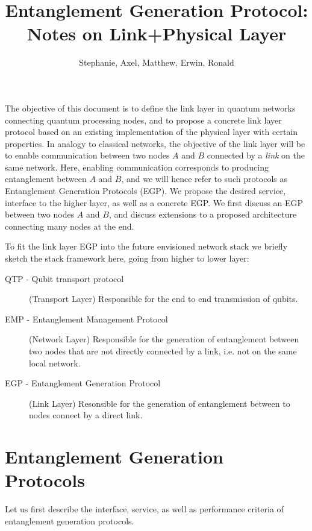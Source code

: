 \documentclass{article}
\begin{document}
\title{Entanglement Generation Protocol: Notes on Link+Physical Layer}
\author{Stephanie, Axel, Matthew, Erwin, Ronald}
\maketitle

The objective of this document is to define the link layer in quantum networks connecting quantum processing nodes, and to propose a concrete link layer protocol 
based on an existing implementation of the physical layer with certain properties. In analogy to classical networks, the objective of the link layer will be to enable communication between two nodes $A$ and $B$ connected by a \emph{link} on the same network. Here, enabling communication corresponds to producing entanglement between $A$ and $B$, and we will hence refer to such protocols as Entanglement Generation Protocols (EGP). 
We propose the desired service, interface to the higher layer, as well as a concrete EGP. We first discuss an EGP between two nodes $A$ and $B$, and discuss extensions
to a proposed architecture connecting many nodes at the end.

To fit the link layer EGP into the future envisioned network stack we briefly sketch the stack framework here, going from higher to lower layer:
\begin{description}
\item[QTP - Qubit transport protocol] (Transport Layer) Responsible for the end to end transmission of qubits. 
\item[EMP - Entanglement Management Protocol] (Network Layer) Responsible for the generation of entanglement between two nodes that are not directly connected by a link, i.e. not on the same local network.
\item[EGP - Entanglement Generation Protocol] (Link Layer) Resonsible for the generation of entanglement between to nodes connect by a direct link. 
\end{description}

\section{Entanglement Generation Protocols}
Let us first describe the interface, service, as well as performance criteria of entanglement generation protocols.
\end{document}
